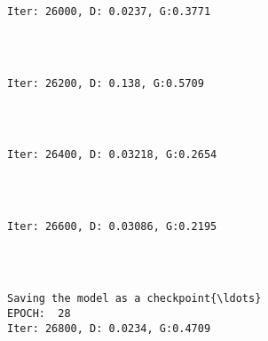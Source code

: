 \documentclass[11pt]{article}
\begin{document}
    \begin{Verbatim}[commandchars=\\\{\}]

Iter: 26000, D: 0.0237, G:0.3771
    \end{Verbatim}

    \begin{center}
    \end{center}
    { \hspace*{\fill} \\}
    
    \begin{Verbatim}[commandchars=\\\{\}]

Iter: 26200, D: 0.138, G:0.5709
    \end{Verbatim}

    \begin{center}
    \end{center}
    { \hspace*{\fill} \\}
    
    \begin{Verbatim}[commandchars=\\\{\}]

Iter: 26400, D: 0.03218, G:0.2654
    \end{Verbatim}

    \begin{center}
    \end{center}
    { \hspace*{\fill} \\}
    
    \begin{Verbatim}[commandchars=\\\{\}]

Iter: 26600, D: 0.03086, G:0.2195
    \end{Verbatim}

    \begin{center}
    \end{center}
    { \hspace*{\fill} \\}
    
    \begin{Verbatim}[commandchars=\\\{\}]

Saving the model as a checkpoint{\ldots}
EPOCH:  28
Iter: 26800, D: 0.0234, G:0.4709
    \end{Verbatim}
\end{document}
